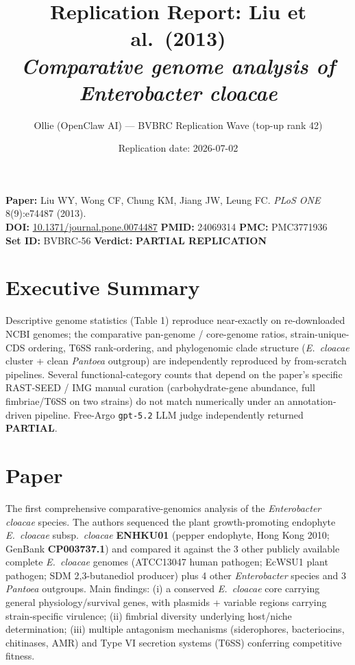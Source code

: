 \documentclass[11pt,letterpaper]{article}
\title{Replication Report: Liu et al.\ (2013)\\
\textit{Comparative genome analysis of Enterobacter cloacae}}
\author{Ollie (OpenClaw AI) --- BVBRC Replication Wave (top-up rank 42)}
\date{Replication date: 2026-07-02}
\begin{document}
\maketitle

\begin{center}
\textbf{Paper:} Liu WY, Wong CF, Chung KM, Jiang JW, Leung FC. \textit{PLoS ONE} 8(9):e74487 (2013).\\
\textbf{DOI:} \href{https://doi.org/10.1371/journal.pone.0074487}{10.1371/journal.pone.0074487} \quad
\textbf{PMID:} 24069314 \quad \textbf{PMC:} PMC3771936\\
\textbf{Set ID:} BVBRC-56 \quad
\textbf{Verdict:} \textbf{PARTIAL REPLICATION}
\end{center}

\section*{Executive Summary}
Descriptive genome statistics (Table 1) reproduce near-exactly on re-downloaded NCBI genomes; the comparative pan-genome / core-genome ratios, strain-unique-CDS ordering, T6SS rank-ordering, and phylogenomic clade structure (\textit{E.\ cloacae} cluster + clean \textit{Pantoea} outgroup) are independently reproduced by from-scratch pipelines. Several functional-category counts that depend on the paper's specific RAST-SEED / IMG manual curation (carbohydrate-gene abundance, full fimbriae/T6SS on two strains) do not match numerically under an annotation-driven pipeline. Free-Argo \texttt{gpt-5.2} LLM judge independently returned \textbf{PARTIAL}.

\section{Paper}
The first comprehensive comparative-genomics analysis of the \textit{Enterobacter cloacae} species. The authors sequenced the plant growth-promoting endophyte \textit{E.\ cloacae} subsp.\ \textit{cloacae} \textbf{ENHKU01} (pepper endophyte, Hong Kong 2010; GenBank \textbf{CP003737.1}) and compared it against the 3 other publicly available complete \textit{E.\ cloacae} genomes (ATCC13047 human pathogen; EcWSU1 plant pathogen; SDM 2,3-butanediol producer) plus 4 other \textit{Enterobacter} species and 3 \textit{Pantoea} outgroups. Main findings: (i) a conserved \textit{E.\ cloacae} core carrying general physiology/survival genes, with plasmids + variable regions carrying strain-specific virulence; (ii) fimbrial diversity underlying host/niche determination; (iii) multiple antagonism mechanisms (siderophores, bacteriocins, chitinases, AMR) and Type VI secretion systems (T6SS) conferring competitive fitness.
\end{document}
